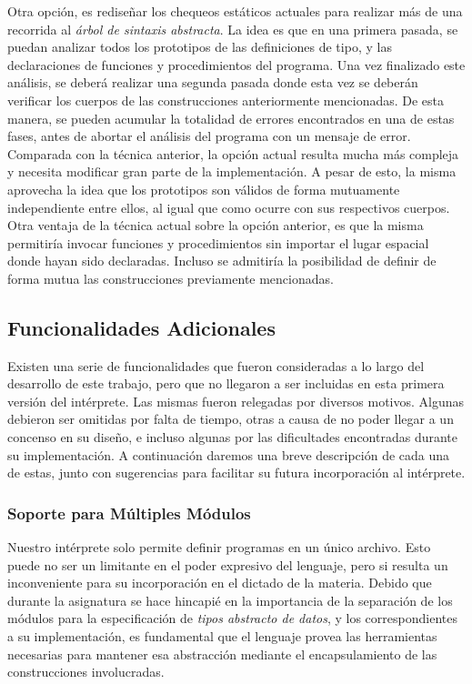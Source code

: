 Otra opción, es rediseñar los chequeos estáticos actuales para realizar más de una recorrida al \textit{árbol de sintaxis abstracta}.
La idea es que en una primera pasada, se puedan analizar todos los prototipos de las definiciones de tipo, y las declaraciones de funciones y procedimientos del programa.
Una vez finalizado este análisis, se deberá realizar una segunda pasada donde esta vez se deberán verificar los cuerpos de las construcciones anteriormente mencionadas.
De esta manera, se pueden acumular la totalidad de errores encontrados en una de estas fases, antes de abortar el análisis del programa con un mensaje de error.
Comparada con la técnica anterior, la opción actual resulta mucha más compleja y necesita modificar gran parte de la implementación.
A pesar de esto, la misma aprovecha la idea que los prototipos son válidos de forma mutuamente independiente entre ellos, al igual que como ocurre con sus respectivos cuerpos.
Otra ventaja de la técnica actual sobre la opción anterior, es que la misma permitiría invocar funciones y procedimientos sin importar el lugar espacial donde hayan sido declaradas.
Incluso se admitiría la posibilidad de definir de forma mutua las construcciones previamente mencionadas.

\subsection{Funcionalidades Adicionales}

Existen una serie de funcionalidades que fueron consideradas a lo largo del desarrollo de este trabajo, pero que no llegaron a ser incluidas en esta primera versión del intérprete.
Las mismas fueron relegadas por diversos motivos.
Algunas debieron ser omitidas por falta de tiempo, otras a causa de no poder llegar a un concenso en su diseño, e incluso algunas por las dificultades encontradas durante su implementación.
A continuación daremos una breve descripción de cada una de estas, junto con sugerencias para facilitar su futura incorporación al intérprete.

\subsubsection{Soporte para Múltiples Módulos}

Nuestro intérprete solo permite definir programas en un único archivo.
Esto puede no ser un limitante en el poder expresivo del lenguaje, pero si resulta un inconveniente para su incorporación en el dictado de la materia.
Debido que durante la asignatura se hace hincapié en la importancia de la separación de los módulos para la especificación de \textit{tipos abstracto de datos}, y los correspondientes a su implementación, es fundamental que el lenguaje provea las herramientas necesarias para mantener esa abstracción mediante el encapsulamiento de las construcciones involucradas.

